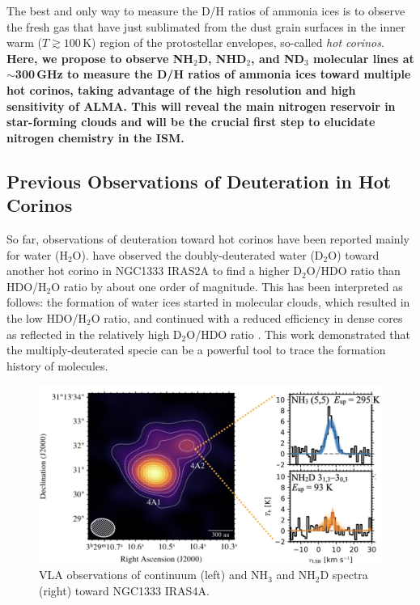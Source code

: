 \documentclass[12pt,a4paper]{article}  %
\begin{document}
\smallskip
\noindent The best and only way to measure the D/H ratios of ammonia ices is to observe the fresh gas that have just sublimated from the dust grain surfaces in the inner warm ($T\gtrsim100$\,K) region of the protostellar envelopes, so-called \textit{hot corinos}. \textbf{Here, we propose to observe NH$_2$D, NHD$_2$, and ND$_3$ molecular lines at $\sim$300\,GHz to measure the D/H ratios of ammonia ices toward multiple hot corinos, taking advantage of the high resolution and high sensitivity of ALMA. This will reveal the main nitrogen reservoir in star-forming clouds and will be the crucial first step to elucidate nitrogen chemistry in the ISM.}

\subsection{Previous Observations of Deuteration in Hot Corinos}
So far, observations of deuteration toward hot corinos have been reported mainly for water (H$_2$O). %
\citet{Coutens14} have observed the doubly-deuterated water (D$_2$O) toward another hot corino in NGC1333 IRAS2A to find a higher D$_2$O/HDO ratio than HDO/H$_2$O ratio by about one order of magnitude. This has been interpreted as follows: the formation of water ices started in molecular clouds, which resulted in the low HDO/H$_2$O ratio, and continued with a reduced efficiency in dense cores as reflected in the relatively high D$_2$O/HDO ratio \citep{Furuya16}. This work demonstrated that the multiply-deuterated specie can be a powerful tool to trace the formation history of molecules.

\smallskip

\begin{figure}
\centering
\vspace{-1em}
\includegraphics[keepaspectratio, width=0.95\hsize]{IRAS4A_ammonia.png}
\caption{VLA observations of continuum (left) and NH$_3$ and NH$_2$D spectra (right) toward NGC1333 IRAS4A.}
\label{fig:IRAS4A_VLA}
\end{figure}
\end{document}
